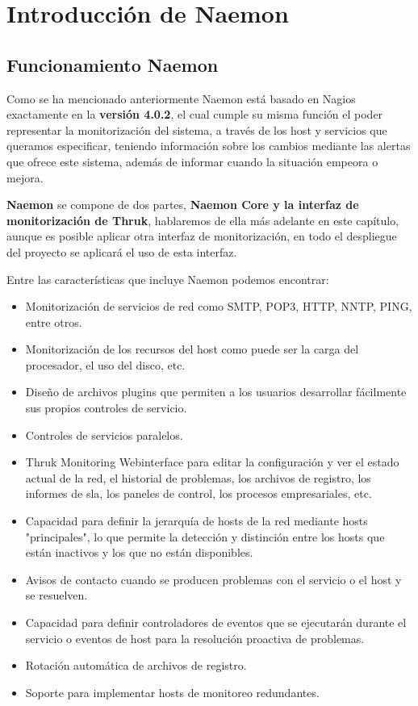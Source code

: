 \section{Introducción de Naemon}
\subsection{Funcionamiento Naemon} 
Como se ha mencionado anteriormente Naemon está basado en Nagios exactamente en la \textbf{versión 4.0.2}, el cual cumple su misma función el poder representar la monitorización del sistema, a través de los host y servicios que queramos especificar, teniendo información sobre los cambios mediante las alertas que ofrece este sistema, además de informar cuando la situación empeora o mejora.\cite{naemon}

\textbf{Naemon} se compone de dos partes, \textbf{Naemon Core y la interfaz de monitorización de Thruk}, hablaremos de ella más adelante en este capítulo, aunque es posible aplicar otra interfaz de monitorización, en todo el despliegue del proyecto se aplicará el uso de esta interfaz.

Entre las características que incluye Naemon podemos encontrar:
\begin{itemize}
	\item Monitorización de servicios de red como SMTP, POP3, HTTP, NNTP, PING, entre otros.
	\item Monitorización de los recursos del host como puede ser la carga del procesador, el uso del disco, etc.
	\item Diseño de archivos plugins que permiten a los usuarios desarrollar fácilmente sus propios controles de servicio.
	\item Controles de servicios paralelos.
	\item Thruk Monitoring Webinterface para editar la configuración y ver el estado actual de la red, el historial de problemas, los archivos de registro, los informes de sla, los paneles de control, los procesos empresariales, etc.
	\item Capacidad para definir la jerarquía de hosts de la red mediante hosts "principales", lo que permite la detección y distinción entre los hosts que están inactivos y los que no están disponibles.
	\item Avisos de contacto cuando se producen problemas con el servicio o el host y se resuelven.
	\item Capacidad para definir controladores de eventos que se ejecutarán durante el servicio o eventos de host para la resolución proactiva de problemas.
	\item Rotación automática de archivos de registro.
	\item Soporte para implementar hosts de monitoreo redundantes.
\end{itemize}

